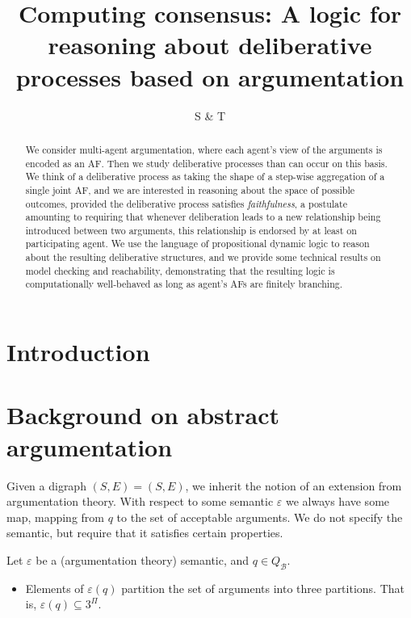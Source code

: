 \documentclass{llncs}
\title{Computing consensus: A logic for reasoning about deliberative processes based on argumentation}
\author{S \& T}
\newcommand{\carriers}[1]{Q_{#1}}
\newcommand{\af}{(S, E)}
\newcommand{\views}{\mathcal B}
\newcommand{\sem}{\varepsilon}
\begin{document}
\maketitle

\begin{abstract}
We consider multi-agent argumentation, where each agent's view of the arguments is encoded as an AF. Then we study deliberative processes than can occur on this basis. We think of a deliberative process as taking the shape of a step-wise aggregation of a single joint AF, and we are interested in reasoning about the space of possible outcomes, provided the deliberative process satisfies \emph{faithfulness}, a postulate amounting to requiring that whenever deliberation leads to a new relationship being introduced between two arguments, this relationship is endorsed by at least on participating agent. We use the language of propositional dynamic logic to reason about the resulting deliberative structures, and we provide some technical results on model checking and reachability, demonstrating that the resulting logic is computationally well-behaved as long as agent's AFs are finitely branching.
\end{abstract}

\section{Introduction}\label{sec:intro}

\section{Background on abstract argumentation}\label{sec:abt}

Given a digraph $\af = (S,E)$, we inherit the notion of an extension from argumentation theory. With respect to some semantic $\sem$ we always have some map, mapping from $q$ to the set of acceptable arguments. We do not specify the semantic, but require that it satisfies certain properties.

\begin{definition} Let $\sem$ be a (argumentation theory) semantic, and $q \in \carriers \views$. 
\begin{itemize}
\item Elements of $\sem(q)$ partition the set of arguments into three partitions. That is, $\sem(q) \subseteq 3^\Pi$. 
\end{itemize}
\end{definition}
\end{document}
